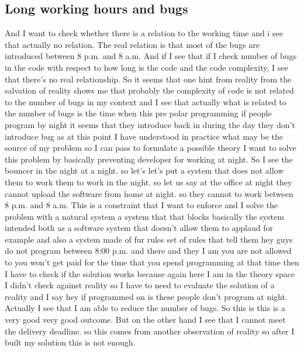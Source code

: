 \documentclass[conference, compsoc, twoside]{IEEEtran}
\begin{document}
\subsection{Long working hours and bugs} %
And I want to check whether there is a relation to the working time and i see that actually no relation.
The real relation is that most of the bugs are introduced between 8 p.m. and 8 a.m. 
And if I see that if I check number of bugs in the code with respect to how long is the code and the code complexity, I see that there's no real relationship.
So it seems that one hint from reality from the salvation of reality shows me that probably the complexity of code is not related to the number of bugs in my context and I see that actually what is related to the number of bugs is the time when this pre polar programming if people program by night it seems that they introduce back in during the day they don't introduce bug as at this point I have understood in practice what may be the source of my problem 
so I can pass to formulate a possible theory I want to solve this problem by basically preventing developer for working at night.
So I see the bouncer in the night at a night. 
so let's let's put a system that does not allow them to work them to work in the night.
so let us say at the office at night they cannot upload the software from home at night.
so they cannot to work between 8 p.m. and 8 a.m. 
This is a constraint that I want to enforce and I solve the problem with a natural system a system that that blocks basically the system intended both as a software system that doesn't allow them to applaud 
for example and also a system made of fur rules set of rules that tell them hey guys do not program between 8:00 p.m. and there and they I am you are not allowed to you won't get paid for the time that you spend programming at that time then I have to check if the solution works because again here I am in the theory space I didn't check against reality 
so I have to need to evaluate the solution of a reality and I say hey if programmed on is these people don't program at night. 
Actually I see that I am able to reduce the number of bugs. 
 So this is this is a very good very good outcome. But on the other hand I see that I cannot meet the delivery deadline. so this comes from another observation of reality so after I built my solution this is not enough.
\end{document}

